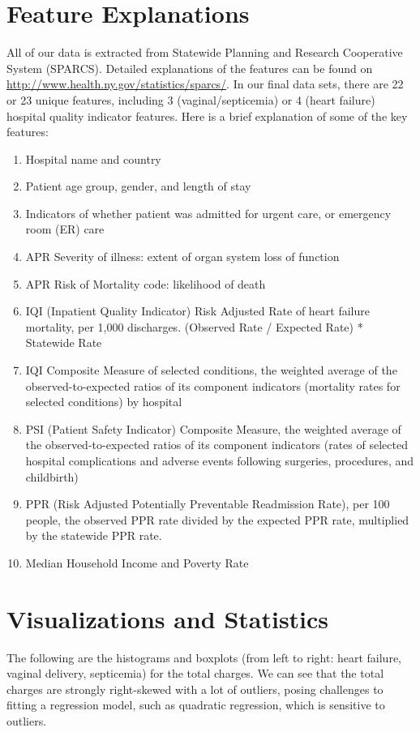 \documentclass[letterpaper,11pt]{article}
\begin{document}
\section*{Feature Explanations}
All of our data is extracted from  Statewide Planning and Research Cooperative System (SPARCS). Detailed explanations of the features can be found on \url{http://www.health.ny.gov/statistics/sparcs/}. In our final data sets, there are 22 or 23 unique features, including 3 (vaginal/septicemia) or 4 (heart failure) hospital quality indicator features. Here is a brief explanation of some of the key features:
\begin{enumerate}
\item Hospital name and country
\item Patient age group, gender, and length of stay
\item Indicators of whether patient was admitted for urgent care, or emergency room (ER) care
\item APR Severity of illness: extent of organ system loss of function
\item APR Risk of Mortality code: likelihood of death
\item IQI (Inpatient Quality Indicator) Risk Adjusted Rate of heart failure mortality, per 1,000 discharges. (Observed Rate / Expected Rate) * Statewide Rate

\item IQI Composite Measure of selected conditions, the weighted average of the observed-to-expected ratios of its component indicators (mortality rates for selected conditions) by hospital

\item PSI (Patient Safety Indicator) Composite Measure, the weighted average of the observed-to-expected ratios of its component indicators (rates of selected hospital complications and adverse events following surgeries, procedures, and childbirth) 

\item PPR (Risk Adjusted Potentially Preventable Readmission Rate), per 100 people, the observed PPR rate divided by the expected PPR rate, multiplied by the statewide PPR rate.

\item Median Household Income and Poverty Rate

\end{enumerate}
\section*{Visualizations and Statistics}
The following are the histograms and boxplots (from left to right: heart failure, vaginal delivery, septicemia) for the total charges. We can see that the total charges are strongly right-skewed with a lot of outliers, posing challenges to fitting a regression model, such as quadratic regression, which is sensitive to outliers. 
\end{document}
